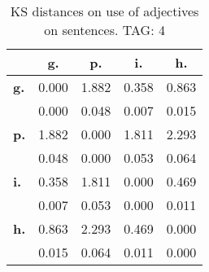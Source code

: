 \begin{table}[h!]
\begin{center}
\begin{tabular}{| l || c | c | c | c |}\hline
 & {\bf g.} & {\bf p.} & {\bf i.} & {\bf h.} \\\hline\hline
{\bf g.} & 0.000 & 1.882 & 0.358 & 0.863 \\
{\bf } & 0.000 & 0.048 & 0.007 & 0.015 \\\hline
{\bf p.} & 1.882 & 0.000 & 1.811 & 2.293 \\
{\bf } & 0.048 & 0.000 & 0.053 & 0.064 \\\hline
{\bf i.} & 0.358 & 1.811 & 0.000 & 0.469 \\
{\bf } & 0.007 & 0.053 & 0.000 & 0.011 \\\hline
{\bf h.} & 0.863 & 2.293 & 0.469 & 0.000 \\
{\bf } & 0.015 & 0.064 & 0.011 & 0.000 \\\hline
\end{tabular}
\caption{KS distances on use of adjectives on sentences. TAG: 4}
\end{center}
\end{table}